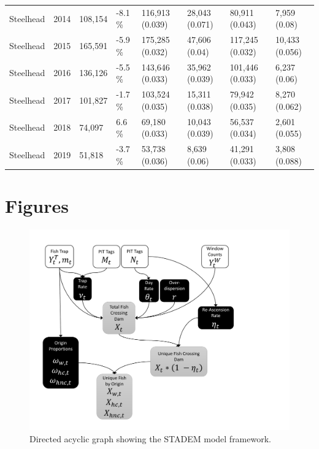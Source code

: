 \documentclass[
  12pt,
]{article}
\begin{document}
\begin{table}[!h]
{\begin{tabular}[t]{lrllllll}
Steelhead & 2014 & 108,154 & -8.1 \% & 116,913 (0.039) & 28,043 (0.071) & 80,911 (0.043) & 7,959 (0.08)\\
Steelhead & 2015 & 165,591 & -5.9 \% & 175,285 (0.032) & 47,606 (0.04) & 117,245 (0.032) & 10,433 (0.056)\\
Steelhead & 2016 & 136,126 & -5.5 \% & 143,646 (0.033) & 35,962 (0.039) & 101,446 (0.033) & 6,237 (0.06)\\
Steelhead & 2017 & 101,827 & -1.7 \% & 103,524 (0.035) & 15,311 (0.038) & 79,942 (0.035) & 8,270 (0.062)\\
Steelhead & 2018 & 74,097 & 6.6 \% & 69,180 (0.033) & 10,043 (0.039) & 56,537 (0.034) & 2,601 (0.055)\\
Steelhead & 2019 & 51,818 & -3.7 \% & 53,738 (0.036) & 8,639 (0.06) & 41,291 (0.033) & 3,808 (0.088)\\
\bottomrule
\end{tabular}}
\end{table}

\newpage

\listoffigures

\newpage

\hypertarget{figures}{%
\section{Figures}\label{figures}}

\begin{figure}
\includegraphics[width=1\linewidth]{../figures/ModelSchematic} \caption{Directed acyclic graph showing the STADEM model framework.}\label{fig:dag-fig}
\end{figure}
\end{document}
